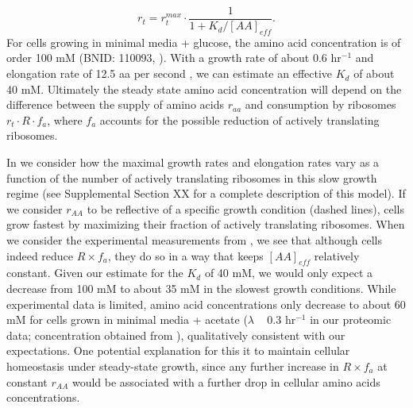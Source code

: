 \begin{equation}
r_t = r_t^{max} \cdot \frac{1}{1 + K_d / [AA]_{eff}}.
\label{eq:rate_Kd}
\end{equation}
For cells growing in minimal media + glucose, the amino acid concentration is of
order 100 mM  (BNID: 110093, \citep{milo2010, bennett2009}). With a growth rate
of about 0.6 hr$^{-1}$ and elongation rate of 12.5 aa per second
\citep{dai2016}, we can estimate an effective $K_d$ of about 40 mM. Ultimately
the steady state amino acid concentration will depend on the difference between
the supply of amino acids $r_{aa}$ and consumption by ribosomes $r_t \cdot R
\cdot f_a$, where $f_a$ accounts for the possible reduction of actively
translating ribosomes.

In  we consider how the maximal growth rates and
elongation rates vary as a function of the number of actively translating
ribosomes in this slow growth regime (see Supplemental Section XX for a complete
description of this model). If we consider $r_{AA}$ to be reflective of a
specific growth condition (dashed lines), cells grow fastest by maximizing their
fraction of actively translating ribosomes. When we consider the experimental
measurements from \cite{dai2018}, we see that although cells indeed reduce $R
\times f_a$, they do so in a way that keeps $[AA]_{eff}$ relatively constant.
Given our estimate for the $K_d$ of 40 mM,  we would only expect a decrease from
100 mM to about 35 mM in the slowest growth conditions. While experimental data
is limited, amino acid concentrations only decrease to about 60 mM for cells
grown in minimal media + acetate ($\lambda$ ~ 0.3 hr$^{-1}$ in our proteomic
data; concentration obtained from \cite{bennett2009}), qualitatively consistent
with our expectations. One potential explanation for this it to maintain
cellular homeostasis under steady-state growth,  since any further increase in
$R \times f_a$ at constant $r_{AA}$ would be associated with a further drop in
cellular amino acids concentrations.


